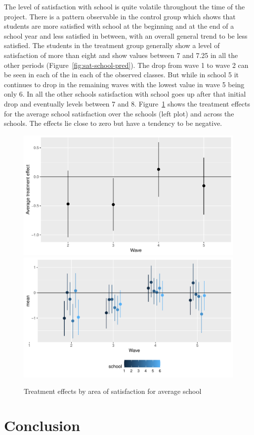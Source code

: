 \documentclass[a4, 12pt]{article}
\begin{document}
\label{sec:results-school}
The level of satisfaction with school is quite volatile throughout the time of the project. There is a pattern observable in the control group which shows that students are more satisfied with school at the beginning and at the end of a school year and less satisfied in between, with an overall general trend to be less satisfied. The students in the treatment group generally show a level of satisfaction of more than eight and show values between 7 and 7.25 in all the other periods (Figure~\ref{fig:sat-school-pred}). The drop from wave 1 to wave 2 can be seen in each of the in each of the observed classes. But while in school 5 it continues to drop in the remaining waves with the lowest value in wave 5 being only 6. In all the other schools satisfaction with school goes up after that initial drop and eventually levels between 7 and 8. Figure~\ref{fig:school} shows the treatment effects for the average school satisfaction over the schools (left plot) and across the schools. The effects lie close to zero but have a tendency to be negative.

\begin{figure}[H]
\includegraphics[width=0.5\linewidth,]{../figures/sat_school_teff} \includegraphics[width=0.5\linewidth,]{../figures/sat_school_teff_across_schools} \caption{Treatment effects by area of satisfaction for average school}\label{fig:school}
\end{figure}

\hypertarget{conclusion}{%
\section{Conclusion}\label{conclusion}}

\label{ch:conclusion}
\end{document}
